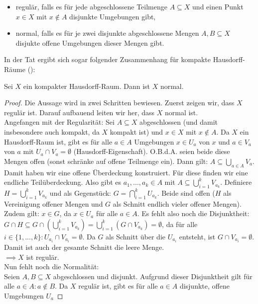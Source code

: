 \documentclass[11pt]{scrartcl}
\begin{document}
{\begin{definition}
	\begin{itemize}
		\item regulär, falls es für jede abgeschlossene Teilmenge $ A \subseteq X$ und einen Punkt $x\in X$ mit $x\notin A$ disjunkte Umgebungen gibt,
		\item normal, falls es für je zwei disjunkte abgeschlossene Mengen $A,B \subseteq X$ disjukte offene Umgebungen dieser Mengen gibt.
	\end{itemize}
\end{definition}
\noindent In der Tat ergibt sich sogar folgender Zusammenhang für kompakte Hausdorff-Räume (\cite{Top2}):
\begin{theorem}\label{CHDisNormal}
	Sei $X$ ein kompakter Hausdorff-Raum. Dann ist $X$ normal.
\end{theorem}
\begin{proof}
	Die Aussage wird in zwei Schritten bewiesen. Zuerst zeigen wir, dass $X$ regulär ist. Darauf aufbauend leiten wir her, dass $X$ normal ist.\\
	Angefangen mit der Regularität:
	Sei $ A \subseteq X$ abgeschlossen (und damit insbesondere auch kompakt, da $X$ kompakt ist) und $x\in X$ mit $x\notin A$. Da $X$ ein Hausdorff-Raum ist, gibt es für alle $a\in A$ Umgebungen 
	$x\in U_a$ von $x$ und $a\in V_a$ von $a$ mit
	$U_a \cap V_a =\emptyset$ (Hausdorff-Eigenschaft). O.B.d.A. seien beide diese Mengen offen (sonst schränke auf offene Teilmenge ein). Dann gilt: $ A \subseteq \bigcup_{a\in A} V_a$.
	Damit haben wir eine offene Überdeckung konstruiert. Für diese finden wir eine endliche Teilüberdeckung. Also gibt es $a_1,...,a_k \in A$ mit $ A \subseteq \bigcup_{i=1}^k V_{a_k}$.
	Definiere $H=\bigcup_{i=1}^k V_{a_k}$ und als Gegenstück: $G = \bigcap_{i=1}^k U_{a_k}$. Beide sind offen ($H$ als Vereinigung offener Mengen und $G$ als Schnitt endlich vieler offener
	Mengen). Zudem gilt: $x\in G$, da $x\in U_{a}$ für alle $a\in A$. Es fehlt also noch die Disjunktheit: $ G \cap H \subseteq G \cap (\bigcup_{i=1}^k V_{a_k}) = \bigcup_{i=1}^k (G \cap V_{a_k})=\emptyset$,
	da für alle $i \in \{1,...,k\}: U_{a_i}\cap V_{a_i} =\emptyset$. Da $G$ als Schnitt über die $U_{a_i}$ entsteht, ist $G\cap V_{a_i} =\emptyset$. Damit ist auch der gesamte Schnitt die leere Menge.\\
	$\implies X$ ist regulär.\\
	Nun fehlt noch die Normalität:\\
	Seien $ A,B \subseteq X$ abgeschlossen und disjunkt. Aufgrund dieser Disjunktheit gilt für alle $a\in A: a\notin B$. Da $X$ regulär ist, gibt es für alle $a\in A$ disjunkte, offene Umgebungen $U_a$ 

\end{proof}}
\end{document}
